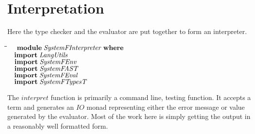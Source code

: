 \documentclass[10pt]{article}
\newlength{\lwidth}\setlength{\lwidth}{4.5cm}
\newlength{\cwidth}\setlength{\cwidth}{8mm} %
\newcommand{\Conid}[1]{\mathit{#1}}
\newcommand{\Varid}[1]{\mathit{#1}}
\begin{document}
\section{Interpretation}

Here the type checker and the evaluator are put together to form an
interpreter.

\begin{tabbing}
\qquad\=\hspace{\lwidth}\=\hspace{\cwidth}\=\+\kill
${\hskip1.00em\relax\mathbf{module}\;\Conid{SystemFInterpreter}\;\mathbf{where}}$\\
${}$\\
${\hskip1.00em\relax\mathbf{import}\;\Conid{LangUtils}}$\\
${\hskip1.00em\relax\mathbf{import}\;\Conid{SystemFEnv}}$\\
${\hskip1.00em\relax\mathbf{import}\;\Conid{SystemFAST}}$\\
${\hskip1.00em\relax\mathbf{import}\;\Conid{SystemFEval}}$\\
${\hskip1.00em\relax\mathbf{import}\;\Conid{SystemFTypesT}}$
\end{tabbing}
The \ensuremath{\Varid{interpret}} function is primarily a command line, testing
function.  It accepts a term and generates an \ensuremath{\Conid{IO}} monad representing
either the error message or value generated by the evaluator.  Most of
the work here is simply getting the output in a reasonably well
formatted form.
\end{document}
